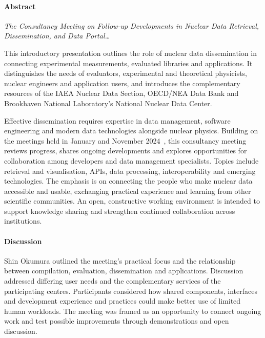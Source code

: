 \paragraph{Abstract}
\textit{The Consultancy Meeting on Follow-up Developments in Nuclear Data Retrieval, Dissemination, and Data Portal\ldots}

This introductory presentation outlines the role of nuclear data dissemination in connecting experimental measurements, evaluated libraries and applications. It distinguishes the needs of evaluators, experimental and theoretical physicists, nuclear engineers and application users, and introduces the complementary resources of the IAEA Nuclear Data Section, OECD/NEA Data Bank and Brookhaven National Laboratory's National Nuclear Data Center.

Effective dissemination requires expertise in data management, software engineering and modern data technologies alongside nuclear physics. Building on the meetings held in January and November 2024~\cite{report2024}, this consultancy meeting reviews progress, shares ongoing developments and explores opportunities for collaboration among developers and data management specialists. Topics include retrieval and visualisation, APIs, data processing, interoperability and emerging technologies. The emphasis is on connecting the people who make nuclear data accessible and usable, exchanging practical experience and learning from other scientific communities. An open, constructive working environment is intended to support knowledge sharing and strengthen continued collaboration across institutions.



\paragraph{Discussion}
Shin Okumura outlined the meeting's practical focus and the relationship between compilation, evaluation, dissemination and applications. Discussion addressed differing user needs and the complementary services of the participating centres. Participants considered how shared components, interfaces and development experience and practices could make better use of limited human workloads. The meeting was framed as an opportunity to connect ongoing work and test possible improvements through demonstrations and open discussion.
